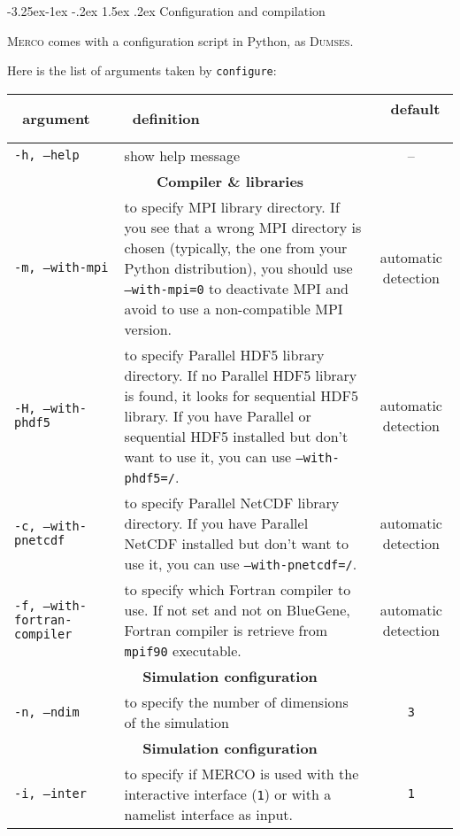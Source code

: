 \documentclass[a4paper,12pt]{article}
\makeatletter
\renewcommand{\subsection}{\@startsection{subsection}{2}{\z@}%
             {-3.25ex\@plus -1ex \@minus -.2ex}%
             {1.5ex \@plus .2ex}%
             {\normalfont\large\sffamily\bfseries}}
\makeatother
\begin{document}
\subsection{Configuration and compilation}

\textsc{Merco} comes with a configuration script in Python, as \textsc{Dumses}.

Here is the list of arguments taken by \texttt{configure}:
\begin{table}[h!]
  \centering
  {\footnotesize
    \begin{tabular}{l | p{} | c }
      ~\hfill argument\hfill~ & ~\hfill definition\hfill~ & ~\hfill default \hfill~ \\
      \hline
      \hline
      \texttt{-h, --help} & show help message & -- \\
      \hline
      \multicolumn{3}{c}{\normalsize \bfseries Compiler \& libraries} \\
      \hline
      \texttt{-m, --with-mpi} & to specify MPI library directory. If you see that a wrong MPI directory is chosen (typically, the one from your Python distribution), you should use \texttt{--with-mpi=0} to deactivate MPI and avoid to use a non-compatible MPI version. & automatic detection \\
      \texttt{-H, --with-phdf5} & to specify Parallel HDF5 library directory. If no Parallel HDF5 library is found, it looks for sequential HDF5 library. If you have Parallel or sequential HDF5 installed but don't want to use it, you can use \texttt{--with-phdf5=/}. & automatic detection \\
      \texttt{-c, --with-pnetcdf} & to specify Parallel NetCDF library directory. If you have Parallel NetCDF installed but don't want to use it, you can use \texttt{--with-pnetcdf=/}. & automatic detection \\
      \texttt{-f, --with-fortran-compiler} & to specify which Fortran compiler to use. If not set and not on BlueGene, Fortran compiler is retrieve from \texttt{mpif90} executable. & automatic detection \\
      \hline
      \multicolumn{3}{c}{\normalsize \bfseries Simulation configuration} \\
      \hline
      \texttt{-n, --ndim} & to specify the number of dimensions of the simulation & \texttt{3} \\
      \hline
      \multicolumn{3}{c}{\normalsize \bfseries Simulation configuration} \\
      \hline
      \texttt{-i, --inter} & to specify if MERCO is used with the interactive interface (\texttt{1}) or with a namelist interface as input. & \texttt{1} \\
      \hline
    \end{tabular}
  }
\end{table}
\end{document}
